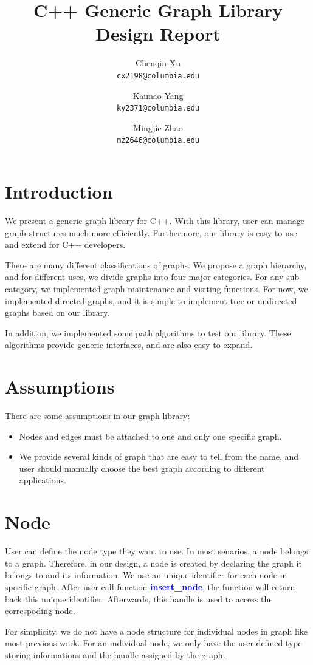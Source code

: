 \documentclass[]{article}
\title{C++ Generic Graph Library Design Report}
\author{Chenqin Xu\\
	{\tt\small cx2198@columbia.edu}
	\and
	Kaimao Yang\\
	{\tt\small ky2371@columbia.edu}
	\and
	Mingjie Zhao\\
	{\tt\small mz2646@columbia.edu}
}
\begin{document}
\maketitle

\tableofcontents
\newpage
\section{Introduction}
We present a generic graph library for C++. With this library, user can manage graph structures much more efficiently. Furthermore, our library is easy to use and extend for C++ developers. 

There are many different classifications of graphs. We propose a graph hierarchy, and for different uses, we divide graphs into four major categories. For any sub-category, we implemented graph maintenance and visiting functions. For now, we implemented directed-graphs, and it is simple to implement tree or undirected graphs based on our library.

In addition, we implemented some path algorithms to test our library. These algorithms provide generic interfaces, and are also easy to expand.
\section{Assumptions}
There are some assumptions in our graph library:
\begin{itemize}
	\item Nodes and edges must be attached to one and only one specific graph.
	\item We provide several kinds of graph that are easy to tell from the name, and user should manually choose the best graph according to different applications.
	\end{itemize}
\section {Node}
User can define the node type they want to use. In most senarios, a node belongs to a graph. Therefore, in our design, a node is created by declaring the graph it belongs to and its information. We use an unique identifier for each node in specific graph. After user call function \textbf{\textcolor{blue}{insert\_node}}, the function will return back this unique identifier. Afterwards, this handle is used to access the correspoding node.

For simplicity, we do not have a node structure for individual nodes in graph like most previous work. For an individual node, we only have the user-defined type storing informations and the handle assigned by the graph.
\end{document}
